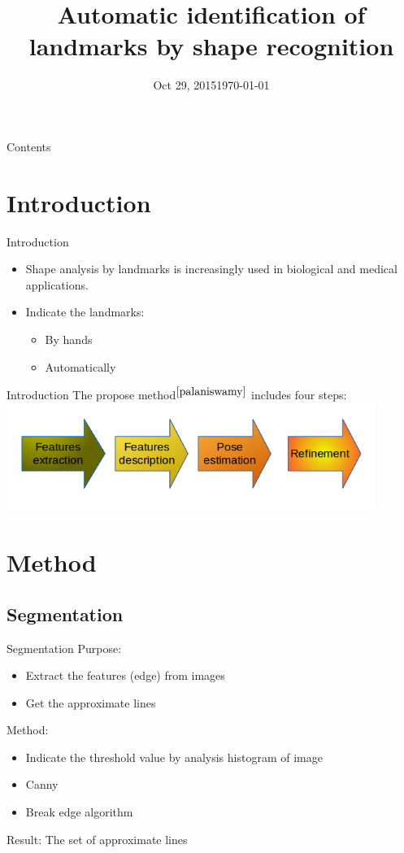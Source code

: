\documentclass{beamer}
\title{Automatic identification of landmarks by shape recognition}
\date{Oct 29, 2015}
\date{\today}
\begin{document}
\frame{\titlepage}
\begin{frame}{Contents}
	\tableofcontents
\end{frame}
\section{Introduction}
\begin{frame}{Introduction}
	\begin{itemize}
		\item Shape analysis by landmarks is increasingly used in biological and medical applications.
		\item Indicate the landmarks:
			\begin{itemize}
				\item By hands
				\item Automatically
			\end{itemize}			  
	\end{itemize}
\end{frame}
\begin{frame}{Introduction}
	The propose method$^{\cite{palaniswamy}}$ includes four steps:
	\includegraphics[height=3.5cm]{images/flow.png}
\end{frame}
\section{Method}
\subsection{Segmentation}
\begin{frame}{Segmentation}
	Purpose: 
	\begin{itemize}
		\item Extract the features (edge) from images
		\item Get the approximate lines
	\end{itemize}
	Method:
	\begin{itemize}
		\item Indicate the threshold value by analysis histogram of image		
		\item Canny
		\item Break edge algorithm
	\end{itemize}
	Result: The set of approximate lines
\end{frame}
\end{document}
